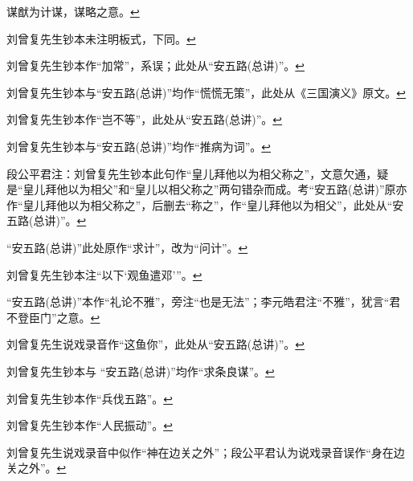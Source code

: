 \item
  \leavevmode\hypertarget{fn244}{}%
  谋猷为计谋，谋略之意。\protect\hyperlink{fnref244}{↩}
\item
  \leavevmode\hypertarget{fn245}{}%
  刘曾复先生钞本未注明板式，下同。\protect\hyperlink{fnref245}{↩}
\item
  \leavevmode\hypertarget{fn246}{}%
  刘曾复先生钞本作``加常''，系误；此处从``安五路(总讲)''。\protect\hyperlink{fnref246}{↩}
\item
  \leavevmode\hypertarget{fn247}{}%
  刘曾复先生钞本与``安五路(总讲)''均作``慌慌无策''，此处从《三国演义》原文。\protect\hyperlink{fnref247}{↩}
\item
  \leavevmode\hypertarget{fn248}{}%
  刘曾复先生钞本作``岂不等''，此处从``安五路(总讲)''。\protect\hyperlink{fnref248}{↩}
\item
  \leavevmode\hypertarget{fn249}{}%
  刘曾复先生钞本与``安五路(总讲)''均作``推病为词''。\protect\hyperlink{fnref249}{↩}
\item
  \leavevmode\hypertarget{fn250}{}%
  段公平君注：刘曾复先生钞本此句作``皇儿拜他以为相父称之''，文意欠通，疑是``皇儿拜他以为相父''和``皇儿以相父称之''两句错杂而成。考``安五路(总讲)''原亦作``皇儿拜他以为相父称之''，后删去``称之''，作``皇儿拜他以为相父''，此处从``安五路(总讲)''。\protect\hyperlink{fnref250}{↩}
\item
  \leavevmode\hypertarget{fn251}{}%
  ``安五路(总讲)''此处原作``求计''，改为``问计''。\protect\hyperlink{fnref251}{↩}
\item
  \leavevmode\hypertarget{fn252}{}%
  刘曾复先生钞本注``以下`观鱼遣邓'''。\protect\hyperlink{fnref252}{↩}
\item
  \leavevmode\hypertarget{fn253}{}%
  ``安五路(总讲)''本作``礼论不雅''，旁注``也是无法''；李元皓君注``不雅''，犹言``君不登臣门''之意。\protect\hyperlink{fnref253}{↩}
\item
  \leavevmode\hypertarget{fn254}{}%
  刘曾复先生说戏录音作``这鱼你''，此处从``安五路(总讲)''。\protect\hyperlink{fnref254}{↩}
\item
  \leavevmode\hypertarget{fn255}{}%
  刘曾复先生钞本与
  ``安五路(总讲)''均作``求条良谋''。\protect\hyperlink{fnref255}{↩}
\item
  \leavevmode\hypertarget{fn256}{}%
  刘曾复先生钞本作``兵伐五路''。\protect\hyperlink{fnref256}{↩}
\item
  \leavevmode\hypertarget{fn257}{}%
  刘曾复先生钞本作``人民振动''。\protect\hyperlink{fnref257}{↩}
\item
  \leavevmode\hypertarget{fn258}{}%
  刘曾复先生说戏录音中似作``神在边关之外''；段公平君认为说戏录音误作``身在边关之外''。\protect\hyperlink{fnref258}{↩}
